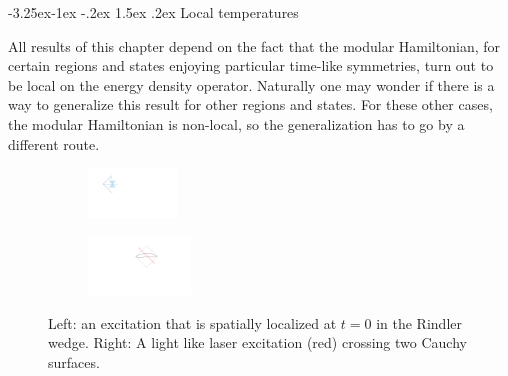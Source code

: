 \documentclass[11pt,a4paper]{article}
\makeatletter
\renewcommand\subsection{\@startsection{subsection}{2}{\z@}%
                                   {-3.25ex\@plus -1ex \@minus -.2ex}%
                                     {1.5ex \@plus .2ex}%
                                     {\normalfont\bfseries}}
\numberwithin{equation}{section}
\makeatother
\begin{document}
\subsection{Local temperatures}

All results of this chapter depend on the fact that the modular Hamiltonian, for certain regions and states enjoying particular time-like symmetries, turn out to be local on the energy density operator. Naturally one may wonder if there is a way to generalize this result for other regions and states. For these other cases, the modular Hamiltonian is non-local, so the generalization has to go by a different route. 

\begin{figure}[t]  
\begin{subfigure}
\centering
\hspace{1.3cm}\includegraphics[width=0.26\textwidth]{uno.pdf}
\end{subfigure}
\hspace{2cm}
\begin{subfigure}
\centering
\includegraphics[width=0.3\textwidth]{dos.pdf}
\end{subfigure}
\captionsetup{width=0.9\textwidth}
\caption{Left: an excitation that is spatially localized at $t=0$ in the Rindler wedge. Right: A light like laser excitation (red) crossing two Cauchy surfaces.}
\label{rayo}
\end{figure}  
\end{document}
